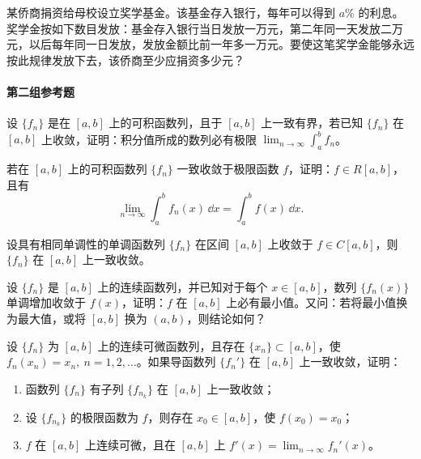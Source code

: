 \begin{xreferenceproblem}[16]
某侨商捐资给母校设立奖学基金。该基金存入银行，每年可以得到 $a\%$ 的利息。奖学金按如下数目发放：基金存入银行当日发放一万元，第二年同一天发放二万元，以后每年同一日发放，发放金额比前一年多一万元。要使这笔奖学金能够永远按此规律发放下去，该侨商至少应捐资多少元？
\end{xreferenceproblem}

\paragraph{第二组参考题}

\begin{xreferenceproblem}[1]
设 $\{f_n\}$ 是在 $[a,b]$ 上的可积函数列，且于 $[a,b]$ 上一致有界，若已知 $\{f_n\}$ 在 $[a,b]$ 上收敛，证明：积分值所成的数列必有极限 $\displaystyle\lim_{n\to\infty}\int_a^b f_n$。
\end{xreferenceproblem}

\begin{xreferenceproblem}[2]
若在 $[a,b]$ 上的可积函数列 $\{f_n\}$ 一致收敛于极限函数 $f$，证明：$f\in R[a,b]$，且有
  \[
    \lim_{n\to\infty}\int_a^b f_n(x)\,\dd x=\int_a^b f(x)\,\dd x.
  \]
\end{xreferenceproblem}

\begin{xreferenceproblem}[3]
设具有相同单调性的单调函数列 $\{f_n\}$ 在区间 $[a,b]$ 上收敛于 $f\in C[a,b]$，则 $\{f_n\}$ 在 $[a,b]$ 上一致收敛。
\end{xreferenceproblem}

\begin{xreferenceproblem}[4]
设 $\{f_n\}$ 是 $[a,b]$ 上的连续函数列，并已知对于每个 $x\in[a,b]$，数列 $\{f_n(x)\}$ 单调增加收敛于 $f(x)$，证明：$f$ 在 $[a,b]$ 上必有最小值。又问：若将最小值换为最大值，或将 $[a,b]$ 换为 $(a,b)$，则结论如何？
\end{xreferenceproblem}

\begin{xreferenceproblem}[5]
设 $\{f_n\}$ 为 $[a,b]$ 上的连续可微函数列，且存在 $\{x_n\}\subset[a,b]$，使 $f_n(x_n)=x_n,\ n=1,2,\ldots$。如果导函数列 $\{f_n'\}$ 在 $[a,b]$ 上一致收敛，证明：
  \begin{enumerate}[label=(\arabic*)]
    \item 函数列 $\{f_n\}$ 有子列 $\{f_{n_k}\}$ 在 $[a,b]$ 上一致收敛；
    \item 设 $\{f_{n_k}\}$ 的极限函数为 $f$，则存在 $x_0\in[a,b]$，使 $f(x_0)=x_0$；
    \item $f$ 在 $[a,b]$ 上连续可微，且在 $[a,b]$ 上 $f'(x)=\displaystyle\lim_{n\to\infty}f_n'(x)$。
  \end{enumerate}
\end{xreferenceproblem}

